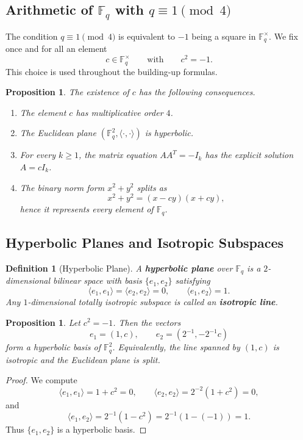 \documentclass[12pt]{article}
\newtheorem{defn}{Definition}[section]
\newtheorem{prop}[theorem]{Proposition}
\newcommand{\F}{\mathbb{F}}
\begin{document}
\subsection{Arithmetic of \texorpdfstring{$\F_q$}{Fq} with \texorpdfstring{$q \equiv 1 \pmod{4}$}{q = 1 (mod 4)}}

The condition $q \equiv 1 \pmod 4$ is equivalent to $-1$ being a square in $\F_q^\times$. We fix once and for all an element
\[
c \in \F_q^\times \qquad \text{with} \qquad c^2 = -1.
\]
This choice is used throughout the building-up formulas.

\begin{prop}\label{prop:split-consequences}
The existence of $c$ has the following consequences.
\begin{enumerate}[label=(\roman*)]
\item The element $c$ has multiplicative order $4$.
\item The Euclidean plane $(\F_q^2,\langle \cdot,\cdot\rangle)$ is hyperbolic.
\item For every $k \ge 1$, the matrix equation $AA^T = -I_k$ has the explicit solution $A=cI_k$.
\item The binary norm form $x^2+y^2$ splits as
\[
x^2+y^2 = (x-cy)(x+cy),
\]
hence it represents every element of\/ $\F_q$.
\end{enumerate}
\end{prop}

\subsection{Hyperbolic Planes and Isotropic Subspaces}

\begin{defn}[Hyperbolic Plane]\label{def:hyp}
A \textbf{hyperbolic plane} over $\F_q$ is a $2$-dimensional bilinear space with basis $\{e_1,e_2\}$ satisfying
\[
\langle e_1,e_1\rangle = \langle e_2,e_2\rangle = 0,
\qquad
\langle e_1,e_2\rangle = 1.
\]
Any $1$-dimensional totally isotropic subspace is called an \textbf{isotropic line}.
\end{defn}

\begin{prop}\label{prop:eucl-hyp}
Let $c^2=-1$. Then the vectors
\[
e_1=(1,c), \qquad e_2=(2^{-1},-2^{-1}c)
\]
form a hyperbolic basis of\/ $\F_q^2$. Equivalently, the line spanned by $(1,c)$ is isotropic and the Euclidean plane is split.
\end{prop}

\begin{proof}
We compute
\[
\langle e_1,e_1\rangle = 1+c^2 = 0,
\qquad
\langle e_2,e_2\rangle = 2^{-2}(1+c^2)=0,
\]
and
\[
\langle e_1,e_2\rangle
= 2^{-1}(1-c^2)
= 2^{-1}(1-(-1))
= 1.
\]
Thus $\{e_1,e_2\}$ is a hyperbolic basis.
\end{proof}
\end{document}
